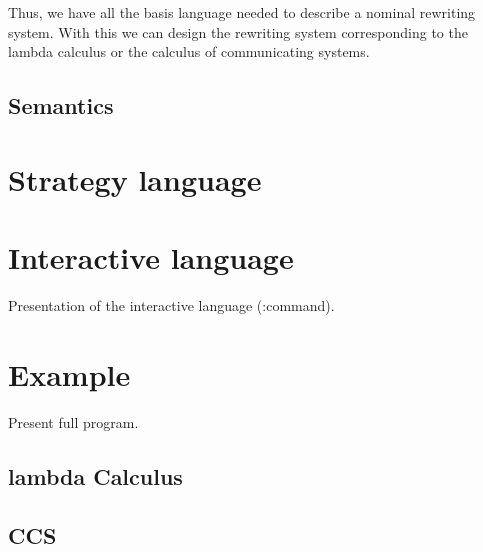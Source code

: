 \documentclass[12pt,a4paper]{article}
\begin{document}
Thus, we have all the basis language needed to describe a nominal
rewriting system. With this we can design the rewriting system
corresponding to the lambda calculus or the calculus of communicating systems.

\subsection{Semantics}

\section{Strategy language}

\section{Interactive language}
Presentation of the interactive language (:command).

\section{Example}
Present full program.

\subsection{lambda Calculus}

\subsection{CCS}
\end{document}

